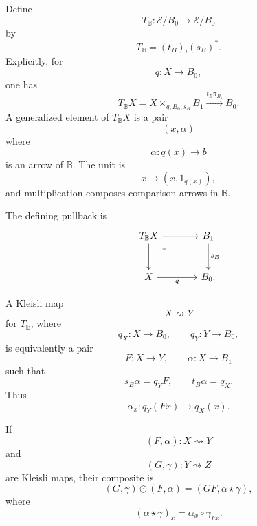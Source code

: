 Define
\[
    T_{\mathbb B}:\mathcal E/B_0\to\mathcal E/B_0
\]
by
\[
    T_{\mathbb B}=(t_B)_!(s_B)^*.
\]
Explicitly, for
\[
    q:X\to B_0,
\]
one has
\[
    T_{\mathbb B}X
    =
    X\times_{q,B_0,s_B}B_1
    \xrightarrow{t_B\pi_{B_1}}
    B_0.
\]
A generalized element of \(T_{\mathbb B}X\) is a pair
\[
    (x,\alpha)
\]
where
\[
    \alpha:q(x)\to b
\]
is an arrow of \(\mathbb B\). The unit is
\[
    x\longmapsto (x,1_{q(x)}),
\]
and multiplication composes comparison arrows in \(\mathbb B\).

The defining pullback is
\[
\begin{tikzcd}[column sep=large, row sep=large]
    T_{\mathbb B}X
        \arrow[r]
        \arrow[d]
        \arrow[dr, phantom, "\lrcorner", very near start]
    &
    B_1
        \arrow[d, "s_B"]
    \\
    X
        \arrow[r, "q"']
    &
    B_0 .
\end{tikzcd}
\]

\begin{proposition}
\label{prop:kleisli-normal-form}
    A Kleisli map
    \[
        X\rightsquigarrow Y
    \]
    for \(T_{\mathbb B}\), where
    \[
        q_X:X\to B_0,
        \qquad
        q_Y:Y\to B_0,
    \]
    is equivalently a pair
    \[
        F:X\to Y,
        \qquad
        \alpha:X\to B_1
    \]
    such that
    \[
        s_B\alpha=q_YF,
        \qquad
        t_B\alpha=q_X.
    \]
    Thus
    \[
        \alpha_x:q_Y(Fx)\to q_X(x).
    \]

    If
    \[
        (F,\alpha):X\rightsquigarrow Y
    \]
    and
    \[
        (G,\gamma):Y\rightsquigarrow Z
    \]
    are Kleisli maps, their composite is
    \[
        (G,\gamma)\odot(F,\alpha)
        =
        (GF,\alpha\star\gamma),
    \]
    where
    \[
        (\alpha\star\gamma)_x
        =
        \alpha_x\circ \gamma_{Fx}.
    \]
\end{proposition}

